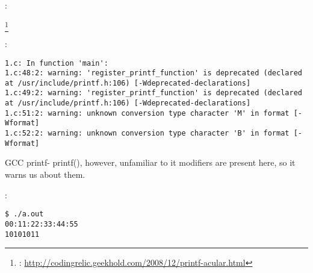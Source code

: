 :


\footnote{:
\url{http://codingrelic.geekhold.com/2008/12/printf-acular.html}}

:

\begin{lstlisting}
1.c: In function 'main':
1.c:48:2: warning: 'register_printf_function' is deprecated (declared at /usr/include/printf.h:106) [-Wdeprecated-declarations]
1.c:49:2: warning: 'register_printf_function' is deprecated (declared at /usr/include/printf.h:106) [-Wdeprecated-declarations]
1.c:51:2: warning: unknown conversion type character 'M' in format [-Wformat]
1.c:52:2: warning: unknown conversion type character 'B' in format [-Wformat]
\end{lstlisting}

\ac{GCC}  printf- printf(),
{however, unfamiliar to it modifiers are present here, so it warns us about them}.

:

\begin{lstlisting}
$ ./a.out
00:11:22:33:44:55
10101011
\end{lstlisting}

